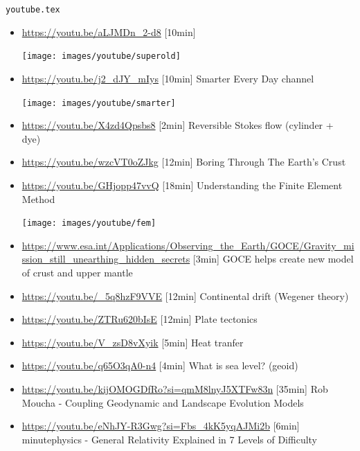 \begin{flushright} {\tiny {\color{gray} \tt youtube.tex}} \end{flushright}

\begin{itemize}
\item \url{https://youtu.be/aLJMDn_2-d8} [10min]
\begin{center}
\texttt{[image: images/youtube/superold]}\\
\end{center}

\item \url{https://youtu.be/j2_dJY_mIys} [10min] Smarter Every Day channel
\begin{center}
\texttt{[image: images/youtube/smarter]}\\
\end{center}

\item \url{https://youtu.be/X4zd4Qpsbs8} [2min] Reversible Stokes flow (cylinder + dye)
\item \url{https://youtu.be/wzcVT0oZJkg} [12min] Boring Through The Earth's Crust
\item \url{https://youtu.be/GHjopp47vvQ} [18min] Understanding the Finite Element Method
\begin{center}
\texttt{[image: images/youtube/fem]}\\
\end{center}

\item \url{https://www.esa.int/Applications/Observing_the_Earth/GOCE/Gravity_mission_still_unearthing_hidden_secrets} [3min] GOCE helps create new model of crust and upper mantle
\item \url{https://youtu.be/_5q8hzF9VVE} [12min] Continental drift (Wegener theory) 
\item \url{https://youtu.be/ZTRu620bIsE} [12min] Plate tectonics
\item \url{https://youtu.be/V_zsD8vXyik} [5min] Heat tranfer 
\item \url{https://youtu.be/q65O3qA0-n4} [4min] What is sea level? (geoid) 

\item \url{https://youtu.be/kijOMOGDfRo?si=qmM8lnyJ5XTFw83n} [35min] Rob Moucha - Coupling Geodynamic and Landscape Evolution Models
\item \url{https://youtu.be/eNhJY-R3Gwg?si=Fbs_4kK5yqAJMi2b} [6min] minutephysics - General Relativity Explained in 7 Levels of Difficulty 

\end{itemize}


